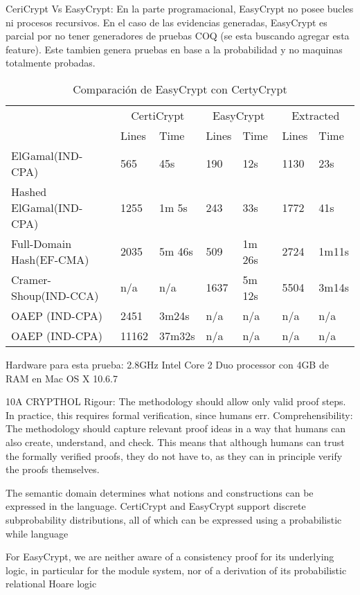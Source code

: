\documentclass[runningheads,a4paper]{llncs}
\begin{document}
CeriCrypt Vs EasyCrypt:
En la parte programacional, EasyCrypt no posee bucles ni procesos recursivos. En el caso de las evidencias generadas, EasyCrypt es parcial por no tener generadores de pruebas COQ (se esta buscando agregar esta feature). Este tambien genera pruebas en base a la probabilidad y no maquinas totalmente probadas.

\begin{table}
  \caption{Comparación de EasyCrypt con CertyCrypt}
  \label{tab:simple1}
  \centering
  \begin{tabular}{ |p{3.5cm}|p{1.5cm}|p{1.5cm}|p{1.5cm}|p{1.5cm}|p{1.5cm}|p{1.5cm}|  }
 \hline
 & \multicolumn{2}{|c|}{CertiCrypt} & \multicolumn{2}{|c|}{EasyCrypt} & \multicolumn{2}{|c|}{Extracted} \\\cline{2-7}

 &Lines&Time&Lines&Time&Lines&Time\\\cline{2-7}
 \hline
 ElGamal(IND-CPA) & 565 & 45s & 190 & 12s & 1130 & 23s\\
 Hashed ElGamal(IND-CPA) & 1255  & 1m 5s & 243  & 33s & 1772 & 41s\\
 Full-Domain Hash(EF-CMA) & 2035 & 5m 46s&  509 & 1m 26s & 2724 & 1m11s\\
 Cramer-Shoup(IND-CCA) & n/a & n/a & 1637 & 5m 12s & 5504 & 3m14s\\
 OAEP (IND-CPA) & 2451 & 3m24s & n/a & n/a & n/a & n/a\\
 OAEP (IND-CPA) & 11162 & 37m32s & n/a & n/a & n/a & n/a\\
 \hline
\end{tabular}
\end{table}

Hardware para esta prueba: 2.8GHz Intel Core 2 Duo processor con 4GB de RAM en Mac OS X 10.6.7

10A
CRYPTHOL
Rigour: The methodology should allow only valid proof steps. In practice, this
requires formal verification, since humans err.
Comprehensibility: The methodology should capture relevant proof ideas in a
way that humans can also create, understand, and check. This means that
although humans can trust the formally verified proofs, they do not have to,
as they can in principle verify the proofs themselves.

The semantic domain determines what notions and constructions can be
expressed in the language. CertiCrypt and EasyCrypt support discrete subprobability distributions, all of which can be expressed using a probabilistic while
language

For EasyCrypt, we
are neither aware of a consistency proof for its underlying logic, in particular for
the module system, nor of a derivation of its probabilistic relational Hoare logic
\end{document}
